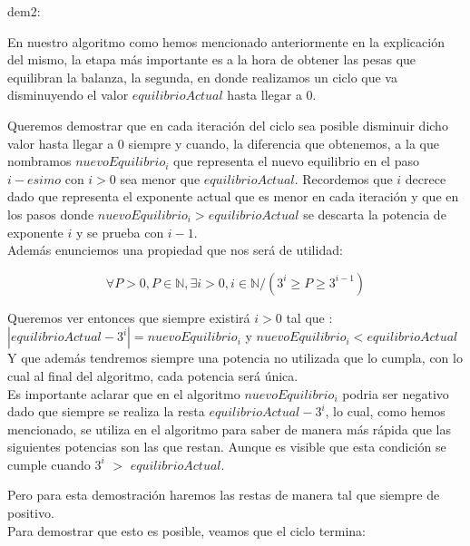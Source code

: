 dem2:

En nuestro algoritmo como hemos mencionado anteriormente en la explicaci\'on del mismo, la etapa m\'as importante es a la hora de obtener las pesas que equilibran la balanza, la segunda, en donde realizamos un ciclo que va disminuyendo el valor $equilibrioActual$ hasta llegar a 0. 

Queremos demostrar que en cada iteraci\'on del ciclo sea posible disminuir dicho valor hasta llegar a 0 siempre y cuando, la diferencia que obtenemos, a la que nombramos $nuevoEquilibrio_{i}$ que representa el nuevo equilibrio en el paso $i-esimo$ con $i > 0$ sea menor que $equilibrioActual$. Recordemos que $i$ decrece dado que representa el exponente actual que es menor en cada iteración y que en los pasos donde $nuevoEquilibrio_{i} > equilibrioActual$  se descarta	 la potencia de exponente $i$ y se prueba con $i-1$.\\

Además enunciemos una propiedad que nos será de utilidad:

\begin{equation}
\forall P > 0, P \in \mathbb{N}, \exists i > 0, i \in \mathbb{N} / (3^i \geq P \geq 3^{i-1})  
\end{equation} \label{eq:prop}

Queremos ver entonces que siempre existirá $i > 0$ tal que :\\

$|equilibrioActual - {3^i}| = nuevoEquilibrio_{i}$ y $nuevoEquilibrio_{i} < equilibrioActual$\\ 

Y que además tendremos siempre una potencia no utilizada que lo cumpla, con lo cual al final del algoritmo, cada potencia será única.\\ 

Es importante aclarar que en el algoritmo $nuevoEquilibrio_{i}$ podria ser negativo dado que siempre se realiza la resta $equilibrioActual - {3^i}$, lo cual, como hemos mencionado, se utiliza en el algoritmo para saber de manera más rápida que las siguientes potencias son las que restan. Aunque es visible que esta condición se cumple cuando ${3^i}$ $>$ $equilibrioActual$. 
  
Pero para esta demostración haremos las restas de manera tal que siempre de positivo.\\ 
 
Para demostrar que esto es posible, veamos que el ciclo termina:\\ 

